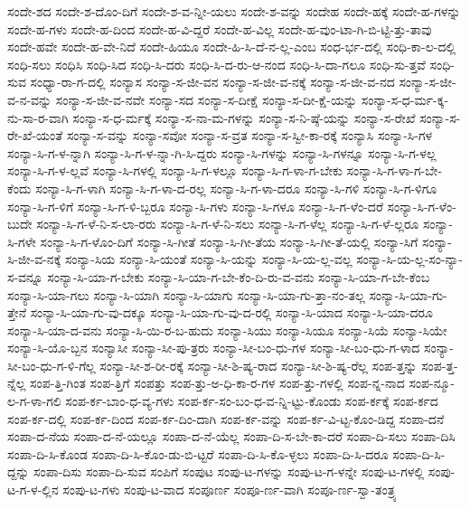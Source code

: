{ಸಂದೇ-ಶದ
ಸಂದೇ-ಶ-ದೊಂ-ದಿಗೆ
ಸಂದೇ-ಶ-ವ-ನ್ನೀ-ಯಲು
ಸಂದೇ-ಶ-ವನ್ನು
ಸಂದೇಹ
ಸಂದೇ-ಹಕ್ಕೆ
ಸಂದೇ-ಹ-ಗಳನ್ನು
ಸಂದೇ-ಹ-ಗಳು
ಸಂದೇ-ಹ-ದಿಂದ
ಸಂದೇ-ಹ-ವಿ-ದ್ದರೆ
ಸಂದೇ-ಹ-ವಿಲ್ಲ
ಸಂದೇ-ಹ-ವುಂ-ಟಾ-ಗಿ-ಬಿ-ಟ್ಟಿ-ತ್ತು-ತಾವು
ಸಂದೇ-ಹವೇ
ಸಂದೇ-ಹ-ವೇ-ನಿದೆ
ಸಂದೇ-ಹಿಯೂ
ಸಂದೇ-ಹಿ-ಸಿ-ದೆ-ನ-ಲ್ಲ-ಎಂಬ
ಸಂಧ-ರ್ಭ-ದಲ್ಲಿ
ಸಂಧಿ-ಕಾ-ಲ-ದಲ್ಲಿ
ಸಂಧಿ-ಸಲು
ಸಂಧಿಸಿ
ಸಂಧಿ-ಸಿದ
ಸಂಧಿ-ಸಿ-ದರು
ಸಂಧಿ-ಸಿ-ದ-ರು-ಆ-ನಂದ
ಸಂಧಿ-ಸಿ-ದಾ-ಗಲೂ
ಸಂಧಿ-ಸು-ತ್ತವೆ
ಸಂಧಿ-ಸುವ
ಸಂಧ್ಯಾ-ರಾ-ಗ-ದಲ್ಲಿ
ಸಂನ್ಯಾಸ
ಸಂನ್ಯಾ-ಸ-ಜೀ-ವನ
ಸಂನ್ಯಾ-ಸ-ಜೀ-ವ-ನಕ್ಕೆ
ಸಂನ್ಯಾ-ಸ-ಜೀ-ವ-ನದ
ಸಂನ್ಯಾ-ಸ-ಜೀ-ವ-ನ-ವನ್ನು
ಸಂನ್ಯಾ-ಸ-ಜೀ-ವ-ನವೇ
ಸಂನ್ಯಾ-ಸದ
ಸಂನ್ಯಾ-ಸ-ದೀಕ್ಷೆ
ಸಂನ್ಯಾ-ಸ-ದೀ-ಕ್ಷೆ-ಯನ್ನು
ಸಂನ್ಯಾ-ಸ-ಧ-ರ್ಮ-ಕ್ಕ-ನು-ಸಾ-ರ-ವಾಗಿ
ಸಂನ್ಯಾ-ಸ-ಧ-ರ್ಮಕ್ಕೆ
ಸಂನ್ಯಾ-ಸ-ನಾ-ಮ-ಗಳನ್ನು
ಸಂನ್ಯಾ-ಸ-ನಿ-ಷ್ಠೆ-ಯನ್ನು
ಸಂನ್ಯಾ-ಸ-ರೇಖೆ
ಸಂನ್ಯಾ-ಸ-ರೇ-ಖೆ-ಯಂತೆ
ಸಂನ್ಯಾ-ಸ-ವನ್ನು
ಸಂನ್ಯಾ-ಸವೋ
ಸಂನ್ಯಾ-ಸ-ವ್ರತ
ಸಂನ್ಯಾ-ಸ-ಸ್ವೀ-ಕಾ-ರಕ್ಕೆ
ಸಂನ್ಯಾಸಿ
ಸಂನ್ಯಾ-ಸಿ-ಗಳ
ಸಂನ್ಯಾ-ಸಿ-ಗ-ಳ-ನ್ನಾಗಿ
ಸಂನ್ಯಾ-ಸಿ-ಗ-ಳ-ನ್ನಾ-ಗಿ-ಸಿ-ದ್ದರು
ಸಂನ್ಯಾ-ಸಿ-ಗಳನ್ನು
ಸಂನ್ಯಾ-ಸಿ-ಗಳನ್ನೂ
ಸಂನ್ಯಾ-ಸಿ-ಗ-ಳಲ್ಲ
ಸಂನ್ಯಾ-ಸಿ-ಗ-ಳ-ಲ್ಲವೆ
ಸಂನ್ಯಾ-ಸಿ-ಗಳಲ್ಲಿ
ಸಂನ್ಯಾ-ಸಿ-ಗ-ಳಲ್ಲೂ
ಸಂನ್ಯಾ-ಸಿ-ಗ-ಳಾ-ಗ-ಬೇಕು
ಸಂನ್ಯಾ-ಸಿ-ಗ-ಳಾ-ಗ-ಬೇ-ಕೆಂದು
ಸಂನ್ಯಾ-ಸಿ-ಗ-ಳಾಗಿ
ಸಂನ್ಯಾ-ಸಿ-ಗ-ಳಾ-ದ-ರಲ್ಲ
ಸಂನ್ಯಾ-ಸಿ-ಗ-ಳಾ-ದರೂ
ಸಂನ್ಯಾ-ಸಿ-ಗಳಿ
ಸಂನ್ಯಾ-ಸಿ-ಗ-ಳಿಗೂ
ಸಂನ್ಯಾ-ಸಿ-ಗ-ಳಿಗೆ
ಸಂನ್ಯಾ-ಸಿ-ಗ-ಳಿ-ಬ್ಬರೂ
ಸಂನ್ಯಾ-ಸಿ-ಗಳು
ಸಂನ್ಯಾ-ಸಿ-ಗಳೂ
ಸಂನ್ಯಾ-ಸಿ-ಗ-ಳೆಂ-ದರೆ
ಸಂನ್ಯಾ-ಸಿ-ಗ-ಳೆಂ-ಬುದೇ
ಸಂನ್ಯಾ-ಸಿ-ಗ-ಳೆ-ನಿ-ಸ-ಲಾ-ರರು
ಸಂನ್ಯಾ-ಸಿ-ಗ-ಳೆ-ನಿ-ಸಲು
ಸಂನ್ಯಾ-ಸಿ-ಗ-ಳೆಲ್ಲ
ಸಂನ್ಯಾ-ಸಿ-ಗ-ಳೆ-ಲ್ಲರೂ
ಸಂನ್ಯಾ-ಸಿ-ಗಳೇ
ಸಂನ್ಯಾ-ಸಿ-ಗ-ಳೊಂ-ದಿಗೆ
ಸಂನ್ಯಾ-ಸಿ-ಗೀತೆ
ಸಂನ್ಯಾ-ಸಿ-ಗೀ-ತೆಯ
ಸಂನ್ಯಾ-ಸಿ-ಗೀ-ತೆ-ಯಲ್ಲಿ
ಸಂನ್ಯಾ-ಸಿಗೆ
ಸಂನ್ಯಾ-ಸಿ-ಜೀ-ವ-ನಕ್ಕೆ
ಸಂನ್ಯಾ-ಸಿಯ
ಸಂನ್ಯಾ-ಸಿ-ಯಂತೆ
ಸಂನ್ಯಾ-ಸಿ-ಯನ್ನು
ಸಂನ್ಯಾ-ಸಿ-ಯ-ಲ್ಲ-ವಲ್ಲ
ಸಂನ್ಯಾ-ಸಿ-ಯ-ಲ್ಲ-ಸಂ-ನ್ಯಾ-ಸ-ವನ್ನೂ
ಸಂನ್ಯಾ-ಸಿ-ಯಾ-ಗ-ಬೇಕು
ಸಂನ್ಯಾ-ಸಿ-ಯಾ-ಗ-ಬೇ-ಕೆಂ-ದಿ-ರು-ವ-ವನು
ಸಂನ್ಯಾ-ಸಿ-ಯಾ-ಗ-ಬೇ-ಕೆಂಬ
ಸಂನ್ಯಾ-ಸಿ-ಯಾ-ಗಲು
ಸಂನ್ಯಾ-ಸಿ-ಯಾಗಿ
ಸಂನ್ಯಾ-ಸಿ-ಯಾಗು
ಸಂನ್ಯಾ-ಸಿ-ಯಾ-ಗು-ತ್ತಾ-ನಂ-ತಲ್ಲ
ಸಂನ್ಯಾ-ಸಿ-ಯಾ-ಗು-ತ್ತೇನೆ
ಸಂನ್ಯಾ-ಸಿ-ಯಾ-ಗು-ವು-ದಕ್ಕೂ
ಸಂನ್ಯಾ-ಸಿ-ಯಾ-ಗು-ವು-ದ-ರಲ್ಲಿ
ಸಂನ್ಯಾ-ಸಿ-ಯಾದ
ಸಂನ್ಯಾ-ಸಿ-ಯಾ-ದರೂ
ಸಂನ್ಯಾ-ಸಿ-ಯಾ-ದ-ವನು
ಸಂನ್ಯಾ-ಸಿ-ಯಿ-ರ-ಬ-ಹುದು
ಸಂನ್ಯಾ-ಸಿಯು
ಸಂನ್ಯಾ-ಸಿಯೂ
ಸಂನ್ಯಾ-ಸಿಯೆ
ಸಂನ್ಯಾ-ಸಿಯೇ
ಸಂನ್ಯಾ-ಸಿ-ಯೊ-ಬ್ಬನ
ಸಂನ್ಯಾಸೀ
ಸಂನ್ಯಾ-ಸೀ-ಪು-ತ್ರರು
ಸಂನ್ಯಾ-ಸೀ-ಬಂ-ಧು-ಗಳ
ಸಂನ್ಯಾ-ಸೀ-ಬಂ-ಧು-ಗ-ಳಾದ
ಸಂನ್ಯಾ-ಸೀ-ಬಂ-ಧು-ಗ-ಳಿ-ಗೆಲ್ಲ
ಸಂನ್ಯಾ-ಸೀ-ಶ-ರೀ-ರಕ್ಕೆ
ಸಂನ್ಯಾ-ಸೀ-ಶಿ-ಷ್ಯ-ರಾದ
ಸಂನ್ಯಾ-ಸೀ-ಶಿ-ಷ್ಯ-ರೆಲ್ಲ
ಸಂಪ-ತ್ತನ್ನು
ಸಂಪ-ತ್ತ-ನ್ನೆಲ್ಲ
ಸಂಪ-ತ್ತಿ-ಗಿಂತ
ಸಂಪ-ತ್ತಿಗೆ
ಸಂಪತ್ತು
ಸಂಪ-ತ್ತು-ಅ-ಧಿ-ಕಾ-ರ-ಗಳ
ಸಂಪ-ತ್ತು-ಗಳಲ್ಲಿ
ಸಂಪ-ನ್ನ-ನಾದ
ಸಂಪ-ನ್ಮೂ-ಲ-ಗ-ಳಾ-ಗಲಿ
ಸಂಪ-ರ್ಕ-ಬಾಂ-ಧ-ವ್ಯ-ಗಳು
ಸಂಪ-ರ್ಕ-ಸಂ-ಬಂ-ಧ-ವ-ನ್ನಿ-ಟ್ಟು-ಕೊಂಡು
ಸಂಪ-ರ್ಕಕ್ಕೆ
ಸಂಪ-ರ್ಕದ
ಸಂಪ-ರ್ಕ-ದಲ್ಲಿ
ಸಂಪ-ರ್ಕ-ದಿಂದ
ಸಂಪ-ರ್ಕ-ದಿಂ-ದಾಗಿ
ಸಂಪ-ರ್ಕ-ವನ್ನು
ಸಂಪ-ರ್ಕ-ವಿ-ಟ್ಟ-ಕೊಂ-ಡಿದ್ದ
ಸಂಪಾ-ದನೆ
ಸಂಪಾ-ದ-ನೆಯ
ಸಂಪಾ-ದ-ನೆ-ಯಲ್ಲೂ
ಸಂಪಾ-ದ-ನೆ-ಯೆಲ್ಲ
ಸಂಪಾ-ದಿ-ಸ-ಬೇ-ಕಾ-ದರೆ
ಸಂಪಾ-ದಿ-ಸಲು
ಸಂಪಾ-ದಿಸಿ
ಸಂಪಾ-ದಿ-ಸಿ-ಕೊಂಡ
ಸಂಪಾ-ದಿ-ಸಿ-ಕೊಂ-ಡು-ಬಿ-ಟ್ಟರೆ
ಸಂಪಾ-ದಿ-ಸಿ-ಕೊ-ಳ್ಳಲು
ಸಂಪಾ-ದಿ-ಸಿ-ದರೂ
ಸಂಪಾ-ದಿ-ಸಿ-ದ್ದನ್ನು
ಸಂಪಾ-ದಿಸು
ಸಂಪಾ-ದಿ-ಸುವ
ಸಂಪಿಗೆ
ಸಂಪುಟ
ಸಂಪು-ಟ-ಗಳನ್ನು
ಸಂಪು-ಟ-ಗ-ಳನ್ನೇ
ಸಂಪು-ಟ-ಗಳಲ್ಲಿ
ಸಂಪು-ಟ-ಗ-ಳ-ಲ್ಲಿನ
ಸಂಪು-ಟ-ಗಳು
ಸಂಪು-ಟ-ವಾದ
ಸಂಪೂರ್ಣ
ಸಂಪೂ-ರ್ಣ-ವಾಗಿ
ಸಂಪೂ-ರ್ಣ-ಸ್ವಾ-ತಂತ್ರ್ಯ
}
